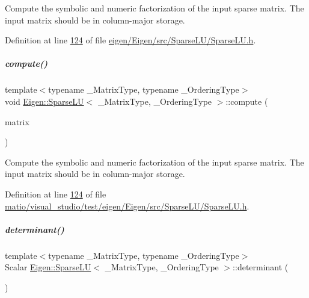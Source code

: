 Compute the symbolic and numeric factorization of the input sparse matrix. The input matrix should be in column-\/major storage. 

Definition at line \hyperlink{eigen_2_eigen_2src_2_sparse_l_u_2_sparse_l_u_8h_source_l00124}{124} of file \hyperlink{eigen_2_eigen_2src_2_sparse_l_u_2_sparse_l_u_8h_source}{eigen/\+Eigen/src/\+Sparse\+L\+U/\+Sparse\+L\+U.\+h}.

\mbox{\label{group___sparse_l_u___module_a96a8dcb02015ab9be5777d4ba9173266}} 
\subparagraph{\texorpdfstring{compute()}{compute()}\hspace{0.1cm}{\footnotesize\ttfamily [2/2]}}
{\footnotesize\ttfamily template$<$typename \+\_\+\+Matrix\+Type, typename \+\_\+\+Ordering\+Type$>$ \\
void \hyperlink{group___sparse_l_u___module_class_eigen_1_1_sparse_l_u}{Eigen\+::\+Sparse\+LU}$<$ \+\_\+\+Matrix\+Type, \+\_\+\+Ordering\+Type $>$\+::compute (\begin{DoxyParamCaption}\item[{const Matrix\+Type \&}]{matrix }\end{DoxyParamCaption})\hspace{0.3cm}{\ttfamily [inline]}}

Compute the symbolic and numeric factorization of the input sparse matrix. The input matrix should be in column-\/major storage. 

Definition at line \hyperlink{matio_2visual__studio_2test_2eigen_2_eigen_2src_2_sparse_l_u_2_sparse_l_u_8h_source_l00124}{124} of file \hyperlink{matio_2visual__studio_2test_2eigen_2_eigen_2src_2_sparse_l_u_2_sparse_l_u_8h_source}{matio/visual\+\_\+studio/test/eigen/\+Eigen/src/\+Sparse\+L\+U/\+Sparse\+L\+U.\+h}.

\mbox{\label{group___sparse_l_u___module_a02d63d242d27211b5c5827f5d4fd99ff}} 
\subparagraph{\texorpdfstring{determinant()}{determinant()}\hspace{0.1cm}{\footnotesize\ttfamily [1/2]}}
{\footnotesize\ttfamily template$<$typename \+\_\+\+Matrix\+Type, typename \+\_\+\+Ordering\+Type$>$ \\
Scalar \hyperlink{group___sparse_l_u___module_class_eigen_1_1_sparse_l_u}{Eigen\+::\+Sparse\+LU}$<$ \+\_\+\+Matrix\+Type, \+\_\+\+Ordering\+Type $>$\+::determinant (\begin{DoxyParamCaption}{ }\end{DoxyParamCaption})\hspace{0.3cm}{\ttfamily [inline]}}

